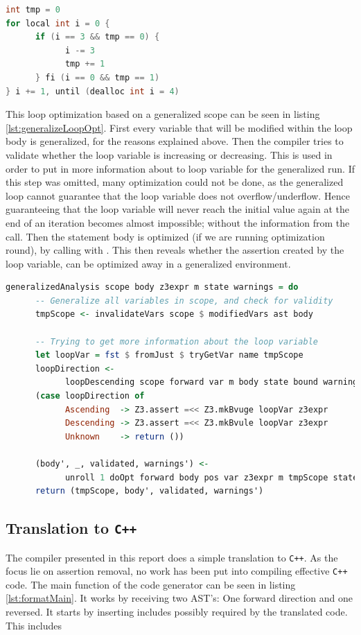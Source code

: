 \begin{lstlisting}[language=C++, label=require-generalize, caption=Loop requirering generalization]
int tmp = 0
for local int i = 0 {
      if (i == 3 && tmp == 0) {
            i -= 3
            tmp += 1
      } fi (i == 0 && tmp == 1)
} i += 1, until (dealloc int i = 4)
\end{lstlisting}
\noindent
This loop optimization based on a generalized scope can be seen in listing
\ref{lst:generalizeLoopOpt}.
First every variable that will be modified within the loop body is generalized, for the
reasons explained above. Then the compiler tries to validate whether the loop variable is
increasing or decreasing. This is used in order to put in more information about to loop
variable for the generalized run. If this step was omitted, many optimization could not be
done, as the generalized loop cannot guarantee that the loop variable does not overflow/underflow.
Hence guaranteeing that the loop variable will never reach the initial value again at the end
of an iteration becomes almost impossible; without the information from the
 call.
Then the statement body is optimized (if we are running optimization round), 
by calling  with . This then reveals whether the assertion
created by the loop variable, can be optimized away in a generalized environment.

\begin{lstlisting}[language=Haskell, label={lst:generalizeLoopOpt},
      caption={Optimizing the loop based on generalized information.}]
generalizedAnalysis scope body z3expr m state warnings = do
      -- Generalize all variables in scope, and check for validity
      tmpScope <- invalidateVars scope $ modifiedVars ast body

      -- Trying to get more information about the loop variable
      let loopVar = fst $ fromJust $ tryGetVar name tmpScope
      loopDirection <-
            loopDescending scope forward var m body state bound warnings
      (case loopDirection of
            Ascending  -> Z3.assert =<< Z3.mkBvuge loopVar z3expr
            Descending -> Z3.assert =<< Z3.mkBvule loopVar z3expr
            Unknown    -> return ())

      (body', _, validated, warnings') <-
            unroll 1 doOpt forward body pos var z3expr m tmpScope state warnings
      return (tmpScope, body', validated, warnings')
\end{lstlisting}

\subsection{Translation to \texttt{C++} }
The \lan compiler presented in this report does a simple translation to \texttt{C++}.
As the focus lie on assertion removal, no work has been put into compiling effective
\texttt{C++} code. The main function of the code generator can be seen in listing
\ref{lst:formatMain}. It works by receiving two AST's: One forward direction and one reversed.
It starts by inserting includes possibly required by the translated code. This includes

